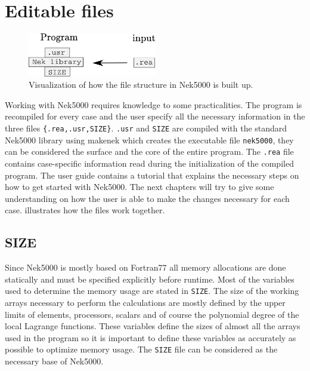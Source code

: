 \section{Editable files}
%
\begin{figure}[h]
	\centering
	\includegraphics[width=0.5\textwidth]{Figures/filestructure2.png}
	\caption{Visualization of how the file structure in Nek5000 is built up.}
	\label{fig:files}
\end{figure}
%
Working with Nek5000 requires knowledge to some practicalities.
The program is recompiled for every case and the user specify all the necessary  
information in the three files \verb|{.rea,.usr,SIZE}|. \verb|.usr| and \verb|SIZE| are 
compiled with the standard Nek5000 library using makenek which creates the executable file \verb|nek5000|,
they can be considered the surface and the core of the entire program. 
The \verb|.rea| file contains case-specific information read during the initialization of the 
compiled program. The user guide \cite{Nek} contains a tutorial that explains the necessary 
steps on how to get started with Nek5000. The next chapters will try to give some understanding on 
how the user is able to make the changes necessary for each case.  illustrates 
how the files work together. 
%
\subsection{SIZE}
Since Nek5000 is mostly based on Fortran77 all memory allocations are done statically and must be specified explicitly 
before runtime. Most of the variables used to determine the memory usage are stated in \verb|SIZE|.
The size of the working arrays necessary to perform the calculations are mostly defined by the upper limits of elements, 
processors, scalars and of course the polynomial degree
of the local Lagrange functions. These variables define the sizes of almost all 
the arrays used in the program so it is important to define these variables as accurately 
as possible to optimize memory usage. The \verb|SIZE| file can be considered as the necessary base 
of Nek5000.
